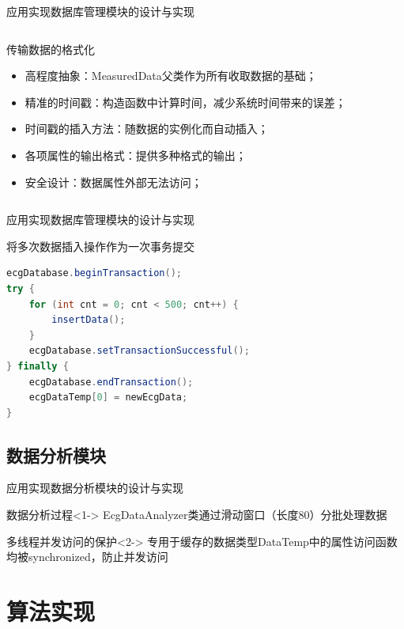 \documentclass[aspectratio=43,fleqn]{beamer}
\begin{document}
\begin{frame}{应用实现}{数据库管理模块的设计与实现}
\begin{columns}
\begin{block}{传输数据的格式化}
		\begin{itemize}
			\item 高程度抽象：MeasuredData父类作为所有收取数据的基础；
			\item 精准的时间戳：构造函数中计算时间，减少系统时间带来的误差；
			\item 时间戳的插入方法：随数据的实例化而自动插入；
			\item 各项属性的输出格式：提供多种格式的输出；
			\item 安全设计：数据属性外部无法访问；
		\end{itemize}
	\end{block}
\end{columns}
\end{frame}

\begin{frame}[fragile]{应用实现}{数据库管理模块的设计与实现}
\begin{block}{将多次数据插入操作作为一次事务提交}
\begin{center}
\begin{lstlisting}[language=java]
ecgDatabase.beginTransaction();
try {
    for (int cnt = 0; cnt < 500; cnt++) {
        insertData();
    }
    ecgDatabase.setTransactionSuccessful();
} finally {
    ecgDatabase.endTransaction();
    ecgDataTemp[0] = newEcgData;
}
\end{lstlisting}
\end{center}
\end{block}
\end{frame}

\subsection{数据分析模块}
\begin{frame}{应用实现}{数据分析模块的设计与实现}
\begin{block}{数据分析过程}<1->
EcgDataAnalyzer类通过滑动窗口（长度80）分批处理数据
\end{block}
\begin{block}{多线程并发访问的保护}<2->
专用于缓存的数据类型DataTemp中的属性访问函数均被synchronized，防止并发访问
\end{block}
\end{frame}

\section{算法实现}
\end{document}
